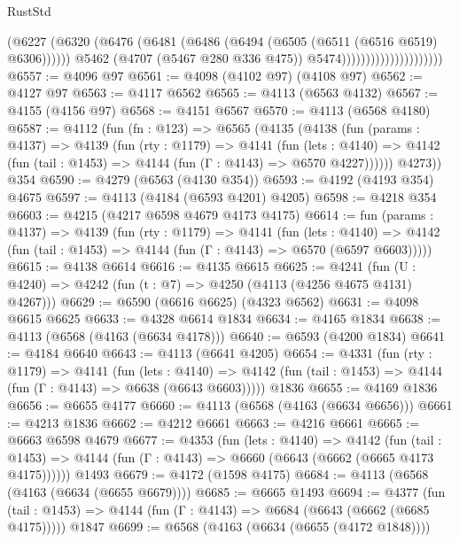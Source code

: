 \begin{lexlean}{RustStd}
\begin{coremodule}
                                          (@6227
                                            (@6320
                                              (@6476
                                                (@6481
                                                  (@6486
                                                    (@6494 (@6505 (@6511 (@6516 @6519) @6306))))))
                                              @5462
                                              (@4707 (@5467 @280 @336 @475))
                                              @5474)))))))))))))))))))))
@6557 := @4096 @97
@6561 := @4098 (@4102 @97) (@4108 @97)
@6562 := @4127 @97
@6563 := @4117 @6562
@6565 := @4113 (@6563 @4132)
@6567 := @4155 (@4156 @97)
@6568 := @4151 @6567
@6570 := @4113 (@6568 @4180)
@6587 := @4112
    (fun (fn : @123) =>
    @6565
      (@4135
        (@4138
          (fun (params : @4137) =>
          @4139
            (fun (rty : @1179) =>
            @4141
              (fun (lets : @4140) =>
              @4142 (fun (tail : @1453) => @4144 (fun (Γ : @4143) => @6570 @4227))))))
        @4273))
    @354
@6590 := @4279 (@6563 (@4130 @354))
@6593 := @4192 (@4193 @354) @4675
@6597 := @4113 (@4184 (@6593 @4201) @4205)
@6598 := @4218 @354
@6603 := @4215 (@4217 @6598 @4679 @4173 @4175)
@6614 := fun (params : @4137) =>
  @4139
    (fun (rty : @1179) =>
    @4141
      (fun (lets : @4140) =>
      @4142 (fun (tail : @1453) => @4144 (fun (Γ : @4143) => @6570 (@6597 @6603)))))
@6615 := @4138 @6614
@6616 := @4135 @6615
@6625 := @4241 (fun (U : @4240) => @4242 (fun (t : @7) => @4250 (@4113 (@4256 @4675 @4131) @4267)))
@6629 := @6590 (@6616 @6625) (@4323 @6562)
@6631 := @4098 @6615 @6625
@6633 := @4328 @6614 @1834
@6634 := @4165 @1834
@6638 := @4113 (@6568 (@4163 (@6634 @4178)))
@6640 := @6593 (@4200 @1834)
@6641 := @4184 @6640
@6643 := @4113 (@6641 @4205)
@6654 := @4331
    (fun (rty : @1179) =>
    @4141
      (fun (lets : @4140) =>
      @4142 (fun (tail : @1453) => @4144 (fun (Γ : @4143) => @6638 (@6643 @6603)))))
    @1836
@6655 := @4169 @1836
@6656 := @6655 @4177
@6660 := @4113 (@6568 (@4163 (@6634 @6656)))
@6661 := @4213 @1836
@6662 := @4212 @6661
@6663 := @4216 @6661
@6665 := @6663 @6598 @4679
@6677 := @4353
    (fun (lets : @4140) =>
    @4142
      (fun (tail : @1453) => @4144 (fun (Γ : @4143) => @6660 (@6643 (@6662 (@6665 @4173 @4175))))))
    @1493
@6679 := @4172 (@1598 @4175)
@6684 := @4113 (@6568 (@4163 (@6634 (@6655 @6679))))
@6685 := @6665 @1493
@6694 := @4377
    (fun (tail : @1453) => @4144 (fun (Γ : @4143) => @6684 (@6643 (@6662 (@6685 @4175)))))
    @1847
@6699 := @6568 (@4163 (@6634 (@6655 (@4172 @1848))))

\end{coremodule}
\end{lexlean}
